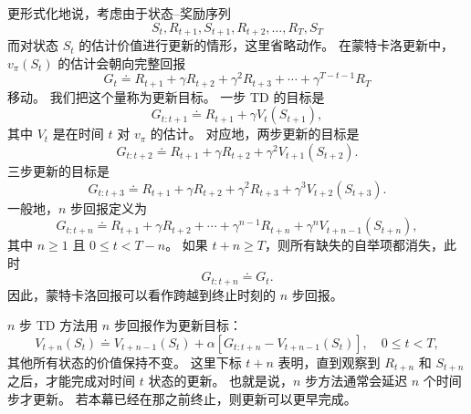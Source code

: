 \documentclass[UTF8,12pt,a4paper,fontset=fandol]{ctexart}
\begin{document}
更形式化地说，考虑由于状态--奖励序列
\[
S_t,R_{t+1},S_{t+1},R_{t+2},\ldots,R_T,S_T
\]
而对状态 $S_t$ 的估计价值进行更新的情形，这里省略动作。
在蒙特卡洛更新中，$v_\pi(S_t)$ 的估计会朝向完整回报
\[
G_t \doteq R_{t+1}+\gamma R_{t+2}+\gamma^2R_{t+3}+\cdots+\gamma^{T-t-1}R_T
\]
移动。
我们把这个量称为更新目标。
一步 TD 的目标是
\[
G_{t:t+1}\doteq R_{t+1}+\gamma V_t(S_{t+1}),
\]
其中 $V_t$ 是在时间 $t$ 对 $v_\pi$ 的估计。
对应地，两步更新的目标是
\[
G_{t:t+2}\doteq R_{t+1}+\gamma R_{t+2}+\gamma^2 V_{t+1}(S_{t+2}).
\]
三步更新的目标是
\[
G_{t:t+3}\doteq R_{t+1}+\gamma R_{t+2}+\gamma^2R_{t+3}+\gamma^3V_{t+2}(S_{t+3}).
\]
一般地，$n$ 步回报定义为
\begin{equation}
G_{t:t+n}\doteq R_{t+1}+\gamma R_{t+2}+\cdots+\gamma^{n-1}R_{t+n}
        +\gamma^n V_{t+n-1}(S_{t+n}),
\tag{7.1}
\end{equation}
其中 $n\ge 1$ 且 $0\le t<T-n$。
如果 $t+n\ge T$，则所有缺失的自举项都消失，此时
\[
G_{t:t+n}\doteq G_t.
\]
因此，蒙特卡洛回报可以看作跨越到终止时刻的 $n$ 步回报。

$n$ 步 TD 方法用 $n$ 步回报作为更新目标：
\begin{equation}
V_{t+n}(S_t)\doteq V_{t+n-1}(S_t)
 +\alpha\left[G_{t:t+n}-V_{t+n-1}(S_t)\right],
\quad 0\le t<T,
\tag{7.2}
\end{equation}
其他所有状态的价值保持不变。
这里下标 $t+n$ 表明，直到观察到 $R_{t+n}$ 和 $S_{t+n}$ 之后，才能完成对时间 $t$ 状态的更新。
也就是说，$n$ 步方法通常会延迟 $n$ 个时间步才更新。
若本幕已经在那之前终止，则更新可以更早完成。
\end{document}
